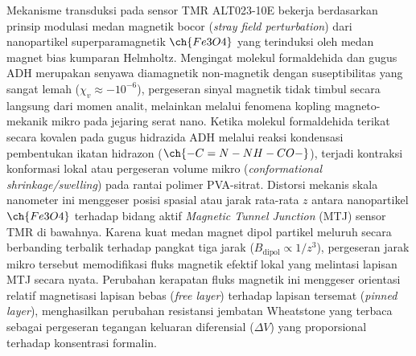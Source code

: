 Mekanisme transduksi pada sensor TMR ALT023-10E bekerja berdasarkan prinsip modulasi medan magnetik bocor (\textit{stray field perturbation}) dari nanopartikel superparamagnetik $\ch{Fe3O4}$ yang terinduksi oleh medan magnet bias kumparan Helmholtz. Mengingat molekul formaldehida dan gugus ADH merupakan senyawa diamagnetik non-magnetik dengan suseptibilitas yang sangat lemah ($\chi_v \approx -10^{-6}$), pergeseran sinyal magnetik tidak timbul secara langsung dari momen analit, melainkan melalui fenomena kopling magneto-mekanik mikro pada jejaring serat nano. Ketika molekul formaldehida terikat secara kovalen pada gugus hidrazida ADH melalui reaksi kondensasi pembentukan ikatan hidrazon ($\ch{-C=N-NH-CO-}$), terjadi kontraksi konformasi lokal atau pergeseran volume mikro (\textit{conformational shrinkage/swelling}) pada rantai polimer PVA-sitrat. Distorsi mekanis skala nanometer ini menggeser posisi spasial atau jarak rata-rata $z$ antara nanopartikel $\ch{Fe3O4}$ terhadap bidang aktif \textit{Magnetic Tunnel Junction} (MTJ) sensor TMR di bawahnya. Karena kuat medan magnet dipol partikel meluruh secara berbanding terbalik terhadap pangkat tiga jarak ($B_{\text{dipol}} \propto 1/z^3$), pergeseran jarak mikro tersebut memodifikasi fluks magnetik efektif lokal yang melintasi lapisan MTJ secara nyata. Perubahan kerapatan fluks magnetik ini menggeser orientasi relatif magnetisasi lapisan bebas (\textit{free layer}) terhadap lapisan tersemat (\textit{pinned layer}), menghasilkan perubahan resistansi jembatan Wheatstone yang terbaca sebagai pergeseran tegangan keluaran diferensial ($\Delta V$) yang proporsional terhadap konsentrasi formalin.

